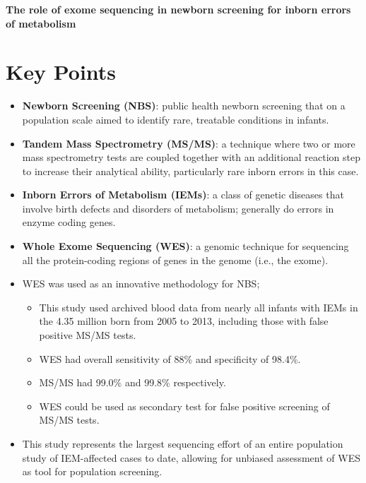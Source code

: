 \documentclass[plain,basic]{inVerba-notes}
\begin{document}
    

\begin{center}
    \textbf{\Large{The role of exome sequencing in newborn screening for inborn errors of metabolism}}
\end{center}

\section{Key Points}
\begin{itemize}
    \item \textbf{Newborn Screening (NBS)}: public health newborn screening that on a population scale aimed to identify rare, treatable conditions in infants.
    \item \textbf{Tandem Mass Spectrometry (MS/MS)}: a technique where two or more mass spectrometry tests are coupled together with an additional reaction step to increase their analytical ability, particularly rare inborn errors in this case.
    \item \textbf{Inborn Errors of Metabolism (IEMs)}: a class of genetic diseases that involve birth defects and disorders of metabolism; generally do errors in enzyme coding genes.
    \item \textbf{Whole Exome Sequencing (WES)}: a genomic technique for sequencing all the protein-coding regions of genes in the genome (i.e., the exome). 
    \item WES was used as an innovative methodology for NBS\@;
        \begin{itemize}
            \item This study used archived blood data from nearly all  infants with IEMs in the 4.35 million born from 2005 to 2013, including those with false positive MS/MS tests.
            \item WES had overall sensitivity of 88\% and specificity of 98.4\%.        
            \item MS/MS had 99.0\% and 99.8\% respectively.
            \item WES could be used as secondary test for false positive screening of MS/MS tests.
        \end{itemize}
    \item This study represents the largest sequencing effort of an entire population study of IEM-affected cases to date, allowing for unbiased assessment of WES as tool for population screening.
\end{itemize}


\nocite{adhikari2020role}


\end{document}
